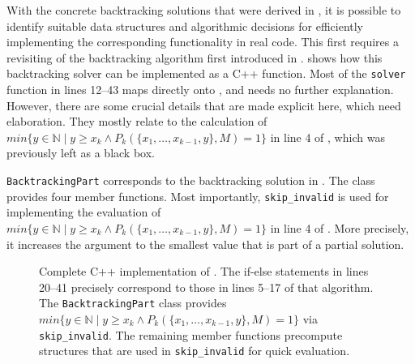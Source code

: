     With the concrete backtracking solutions that were derived in
    , it is possible to
    identify suitable data structures and algorithmic decisions for efficiently
    implementing the corresponding functionality in real code.
    This first requires a revisiting of the backtracking algorithm first
    introduced in .
     shows how this backtracking solver can be implemented as
    a C++ function.
    Most of the \texttt{solver} function in lines 12--43 maps directly onto
    , and needs no further explanation.
    However, there are some crucial details that are made explicit here, which
    need elaboration.
    They mostly relate to the calculation of
    $min\{y\in\mathbb N\mid y\geq x_k\mathrel\land P_k(\{x_1,\dots,x_{k-1},y\},M)=1\}$
    in line 4 of , which was previously left as a black
    box.

    \texttt{BacktrackingPart} corresponds to the backtracking solution in
    .
    The class provides four member functions.
    Most importantly, \texttt{skip\_invalid} is used for implementing the
    evaluation of
    $min\{y\in\mathbb N\mid y\geq x_k\mathrel\land P_k(\{x_1,\dots,x_{k-1},y\},M)=1\}$
    in line 4 of .
    More precisely, it increases the argument to the smallest value that is
    part of a partial solution.

\begin{figure}[p]
    
    \caption{Complete C++ implementation of .
             The if-else statements in lines 20--41 precisely correspond
             to those in lines 5--17 of that algorithm.
             The \texttt{BacktrackingPart} class provides
             $min\{y\in\mathbb N\mid y\geq x_k\mathrel\land P_k(\{x_1,\dots,x_{k-1},y\},M)=1\}$
             via \texttt{skip\_invalid}.
             The remaining member functions precompute structures that
             are used in \texttt{skip\_invalid} for quick evaluation.}
    \label{cppsolver}
\end{figure}

